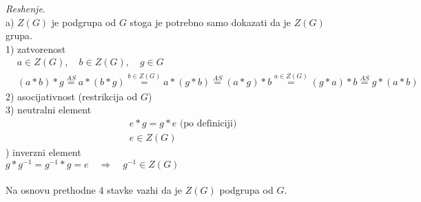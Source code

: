 \documentclass[11pt]{article}
\newcommand*{\as}{\stackrel{\text{$AS$}}{=}}
\begin{document}
\textit{Reshenje}.\\
a) $Z(G)$ je podgrupa od $G$ stoga je potrebno samo dokazati da je $Z(G)$ grupa.\\
1) zatvorenost
\begin{align*}
    &a\in Z(G),\quad b\in Z(G), \quad g\in G\\
    &(a*b)*g\as a*(b*g)\stackrel{b\in Z(G)}{=}a*(g*b)\as (a*g)*b\stackrel{a\in Z(G)}{=}(g*a)*b\as g*(a*b)
\end{align*}
2) asocijativnost (restrikcija od $G$)\\
3) neutralni element\\
\begin{align*}
    &e*g=g*e \text{ (po definiciji)}\\
    &e\in Z(G)
\end{align*}
) inverzni element\\
$g*g^{-1}=g^{-1}*g=e \quad\Rightarrow\quad g^{-1}\in Z(G)$ \\\\
Na osnovu prethodne 4 stavke vazhi da je $Z(G)$ podgrupa od $G$.\\
\end{document}

